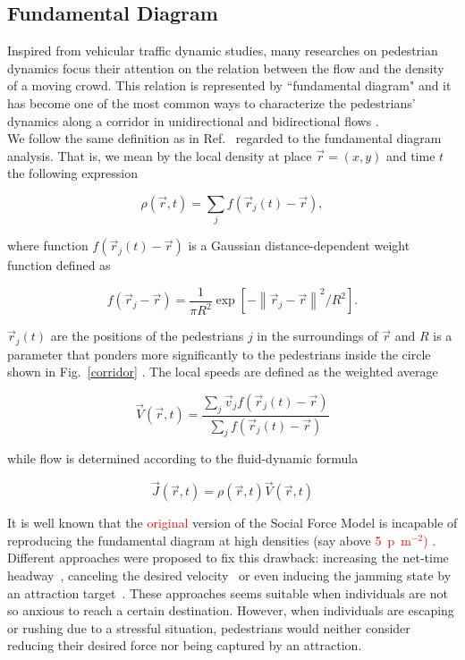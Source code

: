 \documentclass[preprint,12pt]{elsarticle}
\begin{document}
\subsection{\label{fundamental-diagram} Fundamental Diagram}

Inspired from vehicular traffic dynamic studies, many researches on pedestrian dynamics focus their attention on the relation between the flow and the density of a moving crowd. This relation is represented by ``fundamental diagram" and it has become one of the most common ways to characterize the pedestrians' dynamics along a corridor in unidirectional and bidirectional flows \cite{fruin1,mori1,polus1,seyfried1,jelic1}. \\

We follow the same definition as in Ref.~\cite{helbing3} regarded to the fundamental diagram analysis. That is, we mean by the local density at place $\vec{r}=(x,y)$ and time $t$ the following expression

\begin{equation}
\rho(\vec{r},t)=\sum_{j}f(\vec{r}_j(t)-\vec{r}), \label{ec-density}
\end{equation}

where function $f(\vec{r}_j(t)-\vec{r})$ is a Gaussian distance-dependent weight function defined as

\begin{equation}
f(\vec{r}_j-\vec{r})=\frac{1}{\pi R^2}\exp[-\left \| \vec{r}_j-\vec{r} \right \|^2/R^2]. \label{ec-f}
\end{equation}

$\vec{r}_j(t)$ are the positions of the pedestrians $j$ in the surroundings of $\vec{r}$ and $R$ is a parameter that ponders more significantly to the pedestrians inside the circle shown in Fig.~\ref{corridor} . 
The local speeds are defined as the weighted average  

\begin{equation}
\vec{V}(\vec{r},t)=\frac{\sum_j \vec{v}_jf(\vec{r}_j(t)-\vec{r}) }{\sum_j f(\vec{r}_j(t)-\vec{r}) } \label{ec-v}
\end{equation}

while flow is determined according to the fluid-dynamic formula

\begin{equation}
\vec{J}(\vec{r},t)=\rho(\vec{r},t)\vec{V}(\vec{r},t) \label{ec-flow}
\end{equation}

It is well known that the \textcolor{red}{original} version of the Social Force 
Model  is incapable of reproducing the 
fundamental diagram at high densities (say above 
\textcolor{red}{5~p~m$^{-2}$)} \textcolor{red}{\cite{parisi2}} . Different 
approaches were proposed to fix this drawback: increasing the net-time 
headway~\cite{johansson}, canceling the desired velocity~\cite{parisi2} or even 
inducing the jamming state by an attraction target~\cite{kwak}. These approaches 
seems suitable when individuals are not so anxious to reach a certain 
destination. However, when individuals are escaping or rushing due to a 
stressful situation, pedestrians would neither consider reducing their desired 
force nor being captured by an attraction. \\
\end{document}
